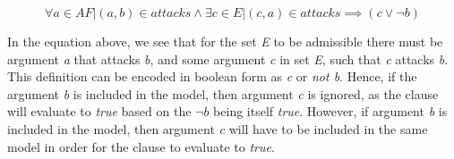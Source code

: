 \begin{equation}
\forall a \in AF | (a,b) \in attacks \land \exists c \in E | (c,a) \in attacks \implies (c \lor \neg b)
\end{equation}

In the equation above, we see that for the set \textit{E} to be admissible there must be argument \textit{a} that attacks \textit{b}, and some argument \textit{c} in set \textit{E}, such that \textit{c} attacks \textit{b}. This definition can be encoded in boolean form as \textit{c} or \textit{not b}. Hence, if the argument \textit{b} is included in the model, then argument \textit{c} is ignored, as the clause will evaluate to \textit{true} based on the $\neg b$ being itself \textit{true}. However, if argument \textit{b} is included in the model, then argument \textit{c} will have to be included in the same model in order for the clause to evaluate to \textit{true}.